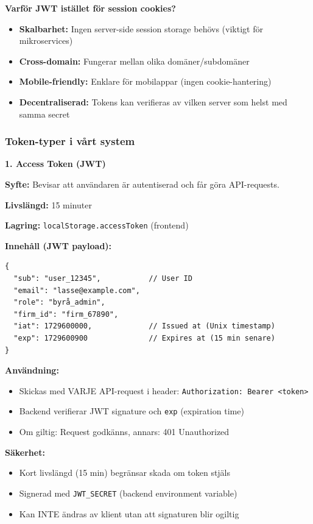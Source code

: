 \documentclass[12pt,a4paper]{article}
\begin{document}
\textbf{Varför JWT istället för session cookies?}
\begin{itemize}[noitemsep]
  \item \textbf{Skalbarhet:} Ingen server-side session storage behövs (viktigt för mikroservices)
  \item \textbf{Cross-domain:} Fungerar mellan olika domäner/subdomäner
  \item \textbf{Mobile-friendly:} Enklare för mobilappar (ingen cookie-hantering)
  \item \textbf{Decentraliserad:} Tokens kan verifieras av vilken server som helst med samma secret
\end{itemize}

\subsubsection{Token-typer i vårt system}

\textbf{1. Access Token (JWT)}

\textbf{Syfte:} Bevisar att användaren är autentiserad och får göra API-requests.

\textbf{Livslängd:} 15 minuter

\textbf{Lagring:} \texttt{localStorage.accessToken} (frontend)

\textbf{Innehåll (JWT payload):}
\begin{verbatim}
{
  "sub": "user_12345",           // User ID
  "email": "lasse@example.com",
  "role": "byrå_admin",
  "firm_id": "firm_67890",
  "iat": 1729600000,             // Issued at (Unix timestamp)
  "exp": 1729600900              // Expires at (15 min senare)
}
\end{verbatim}

\textbf{Användning:}
\begin{itemize}[noitemsep]
  \item Skickas med VARJE API-request i header: \texttt{Authorization: Bearer <token>}
  \item Backend verifierar JWT signature och \texttt{exp} (expiration time)
  \item Om giltig: Request godkänns, annars: 401 Unauthorized
\end{itemize}

\textbf{Säkerhet:}
\begin{itemize}[noitemsep]
  \item Kort livslängd (15 min) begränsar skada om token stjäls
  \item Signerad med \texttt{JWT\_SECRET} (backend environment variable)
  \item Kan INTE ändras av klient utan att signaturen blir ogiltig
\end{itemize}
\end{document}
